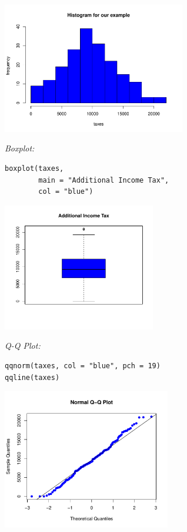 \begin{example}
\begin{center}
\includegraphics[width=0.6\textwidth]{Section7/images/tax_histogram.pdf}
\end{center}

\textit{Boxplot:}

\begin{tcolorbox}[colback=gray!10, colframe=black!45, arc=2mm]
\begin{verbatim}
boxplot(taxes,
        main = "Additional Income Tax",
        col = "blue")
\end{verbatim}
\end{tcolorbox}

\begin{center}
\includegraphics[width=0.5\textwidth]{Section7/images/tax_boxplot.pdf}
\end{center}

\textit{Q-Q Plot:}

\begin{tcolorbox}[colback=gray!10, colframe=black!45, arc=2mm]

\begin{verbatim}
qqnorm(taxes, col = "blue", pch = 19)
qqline(taxes)
\end{verbatim}
\end{tcolorbox}

\begin{center}
\includegraphics[width=0.55\textwidth]{Section7/images/tax_qqplot.pdf}
\end{center}


\end{example}
